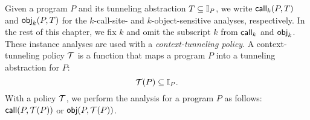Given  a program $P$ and 
its tunneling abstraction $T \subseteq \mathbb{I}_P$, 
we write ${\sf call}_k(P, T)$ and
${\sf obj}_k(P, T)$ for the $k$-call-site- and
$k$-object-sensitive analyses, respectively. In the rest of this chapter, we fix $k$ and omit the subscript $k$ from ${\sf call}_k$ and ${\sf obj}_k$. 
%
%
%
These instance analyses are used with a {\em context-tunneling policy}. 
A context-tunneling policy $\mathcal{T}$ is a function that maps a program $P$ into
a tunneling abstraction for $P$: 
\[
  \mathcal{T}(P) \subseteq \mathbb{I}_P.
\]
With a policy $\mathcal{T}$, 
we  perform the analysis for a program $P$ as follows: ${\sf call}(P, \mathcal{T}(P))$ or ${\sf obj}(P, \mathcal{T}(P))$. 




